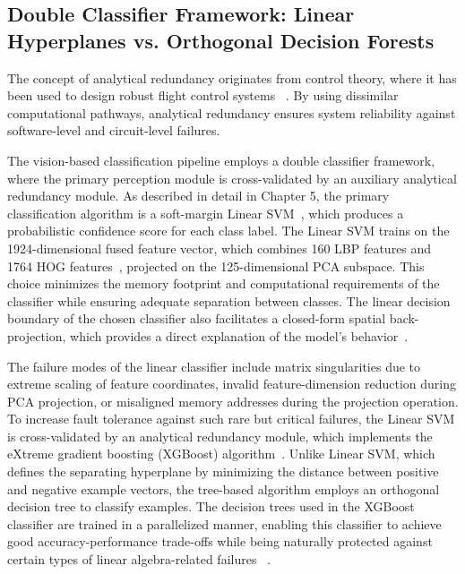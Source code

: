\subsection{Double Classifier Framework: Linear Hyperplanes vs. Orthogonal Decision Forests}

The concept of analytical redundancy originates from control theory, where it has been used to design robust flight control systems ~\cite{belgacem2025toward}. By using dissimilar computational pathways, analytical redundancy ensures system reliability against software-level and circuit-level failures.

The vision-based classification pipeline employs a double classifier framework, where the primary perception module is cross-validated by an auxiliary analytical redundancy module. As described in detail in Chapter 5, the primary classification algorithm is a soft-margin Linear SVM~\cite{cortes1995support}, which produces a probabilistic confidence score for each class label. The Linear SVM trains on the 1924-dimensional fused feature vector, which combines 160 LBP features and 1764 HOG features~\cite{dalal2005histograms}, projected on the 125-dimensional PCA subspace. This choice minimizes the memory footprint and computational requirements of the classifier while ensuring adequate separation between classes. The linear decision boundary of the chosen classifier also facilitates a closed-form spatial back-projection, which provides a direct explanation of the model's behavior~\cite{cervantes2020support}.

The failure modes of the linear classifier include matrix singularities due to extreme scaling of feature coordinates, invalid feature-dimension reduction during PCA projection, or misaligned memory addresses during the projection operation. To increase fault tolerance against such rare but critical failures, the Linear SVM is cross-validated by an analytical redundancy module, which implements the eXtreme gradient boosting (XGBoost) algorithm~\cite{chen2016xgboost}. Unlike Linear SVM, which defines the separating hyperplane by minimizing the distance between positive and negative example vectors, the tree-based algorithm employs an orthogonal decision tree to classify examples. The decision trees used in the XGBoost classifier are trained in a parallelized manner, enabling this classifier to achieve good accuracy-performance trade-offs while being naturally protected against certain types of linear algebra-related failures ~\cite{mannaro2026interpretable}.


